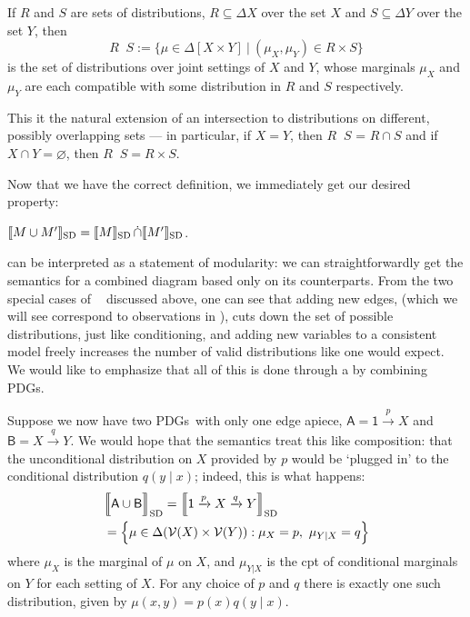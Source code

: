 \documentclass{article}
\newcommand{\notation}[2][]{#1}
\renewcommand{\notation}[2][]{{\color{notationcolor} #2}}
\newcommand\SD{_{\text{SD}}}
\DeclareMathOperator\dcap{\mathop{\dot\cap}}
\newcommand{\V}{\mathcal V}
\newcommand{\MN}{PDG}
\newcommand{\MNs}{\MN s}
\numberwithin{equation}{section}
\begin{document}
	\begin{defn}[$\dcap$]\label{def:marginal-dist-intersection}
		If $R$ and $S$ are sets of distributions, $R \subseteq \Delta X$ over the set $X$ and $S\subseteq \Delta Y$ over the set $Y$, then
			{$$R \dcap S := \Big\{ \mu \in  \Delta [X \!\times\! Y] ~\Big|~ (\mu_{X}, \mu_{Y}) \in R \times S \Big\}  $$}%
		is the set of distributions over joint settings of $X$ and $Y$, whose marginals $\mu_X$ and $\mu_Y$ are each compatible with some distribution in $R$ and $S$ respectively. 
		
		This it the natural extension of an intersection to distributions on different, possibly overlapping sets --- in particular, if $X = Y$, then $R \dcap S$ = $R \cap S$ and if \notation[$X$ and $Y$ are disjoint]{$X \cap Y = \varnothing$}, then $R \dcap S = R \times S$. 
	\end{defn}
	
	
	Now that we have the correct definition, we immediately get our desired property:
	
	\begin{prop}\label{prop:union-set-semantics}
		$\bbr{M \cup M'}\SD = \bbr{M}\SD \dcap \bbr{M'}\SD$.
	\end{prop}

	 can be interpreted as a statement of modularity: we can straightforwardly get the semantics for a combined diagram based only on its counterparts. 
	From the two special cases of $\dcap$ discussed above, one can see that adding new edges, (which we will see correspond to observations in ), cuts down the set of possible distributions, just like conditioning, and adding new variables to a consistent model freely increases the number of valid distributions like one would expect. We would like to emphasize that all of this is done through a by combining \MNs.
	
	\begin{example}\label{ex:sd-compose-unconditional}
		Suppose we now have two \MNs\ with only one edge apiece, $\mathsf A = {\mathsf 1} \xrightarrow{p} X$ and $\mathsf B = X \xrightarrow{q} Y$. We would hope that the semantics treat this like composition: that the unconditional distribution on $X$ provided by $p$ would be `plugged in' to the conditional distribution $q(y \mid x)$; indeed, this is what happens:
		\begin{align*}
			&\bbr[\Big]{{\sf A \cup B}}\SD = \bbr[\Big]{{\mathsf 1} \xrightarrow{p} X \xrightarrow{q} Y}\SD \\
				&= \Big\{  \mu \in \Delta(\V(X) \times \V(Y)) : \mu_X = p,~\mu_{Y|X} = q \Big\} 
		\end{align*}
		where $\mu_X$ is the marginal of $\mu$ on $X$, and $\mu_{Y|X}$ is the cpt of conditional marginals on $Y$ for each setting of $X$.
		For any choice of $p$ and $q$ there is exactly one such distribution, given by $\mu(x,y) = p(x) q(y \mid x)$.
	\end{example}
\end{document}
